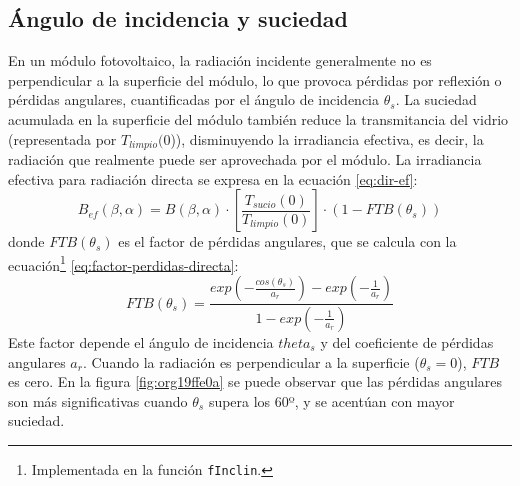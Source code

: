 \subsection{Ángulo de incidencia y suciedad}
\label{sec:org8fc63d5}
\label{subsec-angulo-incidencia-suciedad}
En un módulo fotovoltaico, la radiación incidente generalmente no es perpendicular a la superficie del módulo, lo que provoca pérdidas por reflexión o pérdidas angulares, cuantificadas por el ángulo de incidencia \(\theta_s\). La suciedad acumulada en la superficie del módulo también reduce la transmitancia del vidrio (representada por \(T_{limpio}(0\))), disminuyendo la irradiancia efectiva, es decir, la radiación que realmente puede ser aprovechada por el módulo.
La irradiancia efectiva para radiación directa se expresa en la ecuación \ref{eq:dir-ef}:
\begin{equation}
B_{ef}(\beta ,\alpha)=B(\beta ,\alpha)\cdot [\frac{T_{sucio}(0)}{T_{limpio}(0)}]\cdot (1-FTB(\theta_s))
\label{eq:dir-ef}
\end{equation}
donde \(FTB(\theta_s)\) es el factor de pérdidas angulares, que se calcula con la ecuación\footnote{Implementada en la función \texttt{fInclin}.} \ref{eq:factor-perdidas-directa}: 
\begin{equation}
FTB(\theta_s)=\frac{exp(-\frac{cos(\theta_s)}{a_r})-exp(-\frac{1}{a_r})}{1-exp(-\frac{1}{a_r})}
\label{eq:factor-perdidas-directa}
\end{equation}
Este factor depende el ángulo de incidencia \(theta_s\) y del coeficiente de pérdidas angulares \(a_r\). Cuando la radiación es perpendicular a la superficie (\(\theta_s=0\)), \(FTB\) es cero. En la figura \ref{fig:org19ffe0a} se puede observar que las pérdidas angulares son más significativas cuando \(\theta_s\) supera los 60º, y se acentúan con mayor suciedad.
